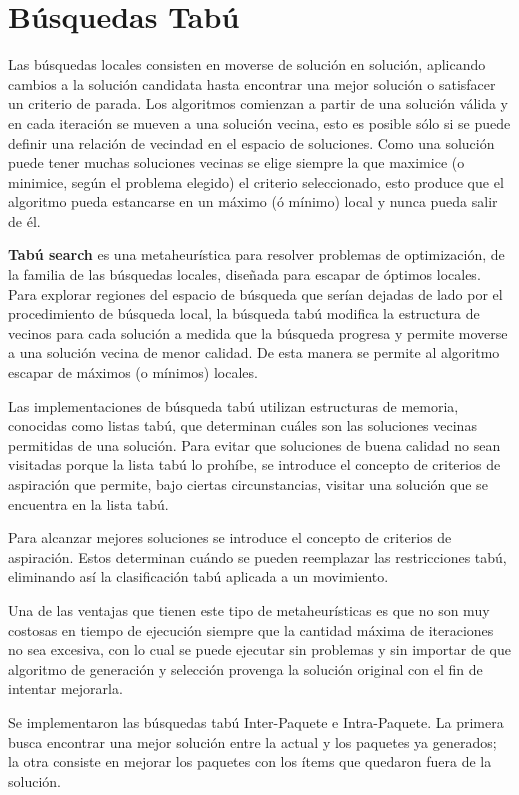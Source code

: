 \section{Búsquedas Tabú}
Las búsquedas locales consisten en moverse de solución en solución, aplicando cambios a la solución candidata hasta encontrar una mejor solución o satisfacer un criterio de parada. Los algoritmos comienzan a partir de una solución válida y en cada iteración se mueven a una solución vecina, esto es posible sólo si se puede definir una relación de vecindad en el espacio de soluciones. Como una solución puede tener muchas soluciones vecinas se elige siempre la que maximice (o minimice, según el problema elegido) el criterio seleccionado, esto produce que el algoritmo pueda estancarse en un máximo (ó mínimo) local y nunca pueda salir de él.

\textbf{Tabú search} es una metaheurística para resolver problemas de optimización, de la familia de las búsquedas locales, diseñada para escapar de óptimos locales. Para explorar regiones del espacio de búsqueda que serían dejadas de lado por el procedimiento de búsqueda local, la búsqueda tabú modifica la estructura de vecinos para cada solución a medida que la búsqueda progresa y permite moverse a una solución vecina de menor calidad. De esta manera se permite al algoritmo escapar de máximos (o mínimos) locales.

Las implementaciones de búsqueda tabú utilizan estructuras de memoria, conocidas como listas tabú, que determinan cuáles son las soluciones vecinas permitidas de una solución. Para evitar que soluciones de buena calidad no sean visitadas porque la lista tabú lo prohíbe, se introduce el concepto de criterios de aspiración que permite, bajo ciertas circunstancias, visitar una solución que se encuentra en la lista tabú.

Para alcanzar mejores soluciones se introduce el concepto de criterios de aspiración. Estos determinan cuándo se pueden reemplazar las restricciones tabú, eliminando así la clasificación tabú aplicada a un movimiento. 

Una de las ventajas que tienen este tipo de metaheurísticas es que no son muy costosas en tiempo de ejecución siempre que la cantidad máxima de iteraciones no sea excesiva, con lo cual se puede ejecutar sin problemas y sin importar de que algoritmo de generación y selección provenga la solución original con el fin de intentar mejorarla.

Se implementaron las búsquedas tabú Inter-Paquete e Intra-Paquete. La primera busca encontrar una mejor solución entre la actual y los paquetes ya generados; la otra consiste en mejorar los paquetes con los ítems que quedaron fuera de la solución.


